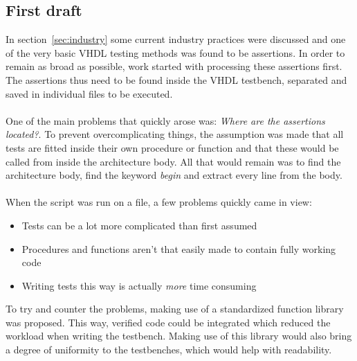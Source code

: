 \documentclass[11pt,british]{article}
\begin{document}
\subsection{First draft}
In section~\ref{sec:industry} some current industry practices were discussed and one of the very basic VHDL testing methods was found to be assertions. In order to remain as broad as possible, work started with processing these assertions first. The assertions thus need to be found inside the VHDL testbench, separated and saved in individual files to be executed.\\
\\
One of the main problems that quickly arose was: \emph{Where are the assertions located?}. To prevent overcomplicating things, the assumption was made that all tests are fitted inside their own procedure or function and that these would be called from inside the architecture body. All that would remain was to find the architecture body, find the keyword \emph{begin} and extract every line from the body.\\
\\
When the script was run on a file, a few problems quickly came in view:
\begin{itemize}
\item Tests can be a lot more complicated than first assumed
\item Procedures and functions aren't that easily made to contain fully working code
\item Writing tests this way is actually \emph{more} time consuming
\end{itemize}
To try and counter the problems, making use of a standardized function library was proposed. This way, verified code could be integrated which reduced the workload when writing the testbench. Making use of this library would also bring a degree of uniformity to the testbenches, which would help with readability.

\newpage{}
\end{document}
